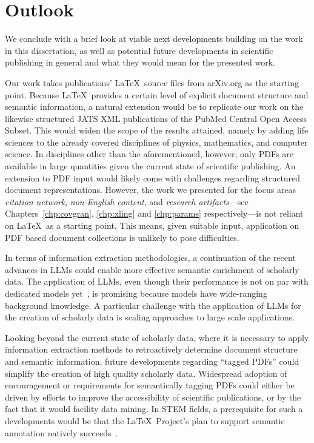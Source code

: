 \section{Outlook}

We conclude with a brief look at viable next developments building on the work in this dissertation, as well as potential future developments in scientific publishing in general and what they would mean for the presented work.

Our work takes publications' \LaTeX\ source files from arXiv.org as the starting point. Because \LaTeX\ provides a certain level of explicit document structure and semantic information, a natural extension would be to replicate our work on the likewise structured JATS XML publications of the PubMed Central Open Access Subset. This would widen the scope of the results attained, namely by adding life sciences to the already covered disciplines of physics, mathematics, and computer science. In disciplines other than the aforementioned, however, only PDFs are available in large quantities given the current state of scientific publishing. An extension to PDF input would likely come with challenges regarding structured document representations. However, the work we presented for the focus areas \emph{citation network}, \emph{non-English content}, and \emph{research artifacts}---see Chapters~\ref{chp:covgran}, \ref{chp:xling} and \ref{chp:params} respectively---is not reliant on \LaTeX\ as a starting point. This means, given suitable input, application on PDF based document collections is unlikely to pose difficulties.

In terms of information extraction methodologies, a continuation of the recent advances in LLMs could enable more effective semantic enrichment of scholarly data. The application of LLMs, even though their performance is not on par with dedicated models yet~\cite{Yang2023}, is promising because models have wide-ranging background knowledge. A particular challenge with the application of LLMs for the creation of scholarly data is scaling approaches to large scale applications.

Looking beyond the current state of scholarly data, where it is necessary to apply information extraction methods to retroactively determine document structure and semantic information, future developments regarding ``tagged PDFs'' could simplify the creation of high quality scholarly data. Widespread adoption of encouragement or requirements for semantically tagging PDFs could either be driven by efforts to improve the accessibility of scientific publications, or by the fact that it would facility data mining. In STEM fields, a prerequisite for such a developments would be that the \LaTeX\ Project's plan to support semantic annotation natively succeeds~\cite{Mittelbach2020,Mittelbach2023}.

